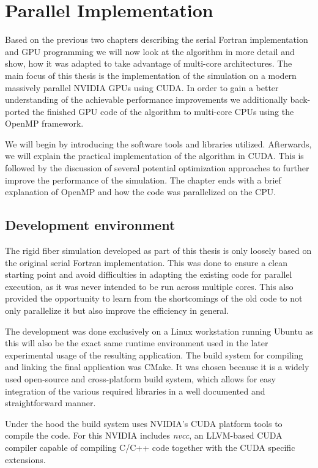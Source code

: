 \chapter{Parallel Implementation}
\label{cha:parallel_implementation}

Based on the previous two chapters describing the serial Fortran implementation and GPU programming we will now look at the algorithm in more detail and show, how it was adapted to take advantage of multi-core architectures. The main focus of this thesis is the implementation of the simulation on a modern massively parallel NVIDIA GPUs using CUDA. In order to gain a better understanding of the achievable performance improvements we additionally back-ported the finished GPU code of the algorithm to multi-core CPUs using the OpenMP framework.

We will begin by introducing the software tools and libraries utilized. Afterwards, we will explain the practical implementation of the algorithm in CUDA. This is followed by the discussion of several potential optimization approaches to further improve the performance of the simulation. The chapter ends with a brief explanation of OpenMP and how the code was parallelized on the CPU.

\section{Development environment}

The rigid fiber simulation developed as part of this thesis is only loosely based on the original serial Fortran implementation. This was done to ensure a clean starting point and avoid difficulties in adapting the existing code for parallel execution, as it was never intended to be run across multiple cores. This also provided the opportunity to learn from the shortcomings of the old code to not only parallelize it but also improve the efficiency in general.

The development was done exclusively on a Linux workstation running Ubuntu as this will also be the exact same runtime environment used in the later experimental usage of the resulting application. The build system for compiling and linking the final application was CMake. It was chosen because it is a widely used open-source and cross-platform build system, which allows for easy integration of the various required libraries in a well documented and straightforward manner.

Under the hood the build system uses NVIDIA's CUDA platform tools to compile the code. For this NVIDIA includes \emph{nvcc}, an LLVM-based CUDA compiler capable of compiling C/C++ code together with the CUDA specific extensions.

